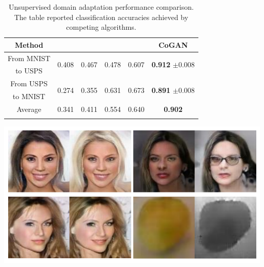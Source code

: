 \begin{table}[t!]
\begin{minipage}[c]{0.65\linewidth}
\centering
	\small
	\begin{tabular}{cccccc}
	Method & \cite{long2013transfer} & \cite{fernando2015joint} & \cite{tzeng2014deep} & \cite{rozantsev2016beyond} & CoGAN\\
	\hline
	From MNIST & \multirow{ 2}{*}{0.408} & \multirow{ 2}{*}{0.467} & \multirow{ 2}{*}{0.478} & \multirow{ 2}{*}{0.607} & \multirow{ 2}{*}{{\bf 0.912} $\pm$0.008}\\
	to USPS & \\	
	From USPS & \multirow{ 2}{*}{0.274} & \multirow{ 2}{*}{0.355} & \multirow{ 2}{*}{0.631} & \multirow{ 2}{*}{0.673} & \multirow{ 2}{*}{{\bf 0.891} $\pm$0.008}\\
	to MNIST & \\		
	Average                & 0.341 & 0.411 & 0.554 & 0.640 & {\bf 0.902}\\
	\hline\\
	\end{tabular}	
\caption{\small Unsupervised domain adaptation performance comparison. The table reported classification accuracies achieved by competing algorithms.}	
\label{tbl::uda}
\end{minipage}\hfill
\begin{minipage}[c]{0.30\linewidth}
\centering
\includegraphics[trim=0.0in 0.0in 0.0in 0in, width=0.99\textwidth]{result_transfer_tight.pdf}    
\label{fig::result_transfer}
\end{minipage}
\end{table}